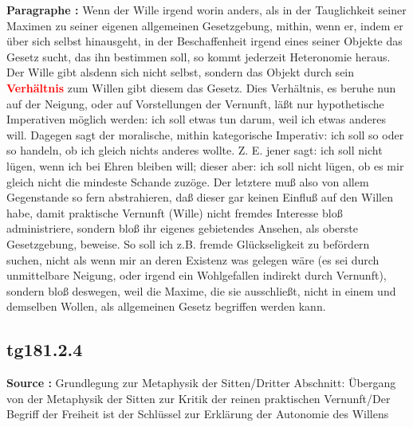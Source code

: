 \documentclass[a4paper,12pt,twoside]{book}
\newcommand{\match}[1]{\textcolor{red}{\textbf{#1}}}
\begin{document}
	\textbf{Paragraphe : }Wenn der Wille irgend worin anders, als in der Tauglichkeit seiner Maximen zu seiner eigenen allgemeinen Gesetzgebung, mithin, wenn er, indem er über sich selbst hinausgeht, in der Beschaffenheit irgend eines seiner Objekte das Gesetz sucht, das ihn bestimmen soll, so kommt jederzeit Heteronomie heraus. Der Wille gibt alsdenn sich nicht selbst, sondern das Objekt durch sein \match{Verhältnis} zum Willen gibt diesem das Gesetz. Dies Verhältnis, es beruhe nun auf der Neigung, oder auf Vorstellungen der Vernunft, läßt nur hypothetische Imperativen möglich werden: ich soll etwas tun darum, weil ich etwas anderes will. Dagegen sagt der moralische, mithin kategorische Imperativ: ich soll so oder so handeln, ob ich gleich nichts anderes wollte. Z. E. jener sagt: ich soll nicht lügen, wenn ich bei Ehren bleiben will; dieser aber: ich soll nicht lügen, ob es  mir gleich nicht die mindeste Schande zuzöge. Der letztere muß also von allem Gegenstande so fern abstrahieren, daß dieser gar keinen Einfluß auf den Willen habe, damit praktische Vernunft (Wille) nicht fremdes Interesse bloß administriere, sondern bloß ihr eigenes gebietendes Ansehen, als oberste Gesetzgebung, beweise. So soll ich z.B. fremde Glückseligkeit zu befördern suchen, nicht als wenn mir an deren Existenz was gelegen wäre (es sei durch unmittelbare Neigung, oder irgend ein Wohlgefallen indirekt durch Vernunft), sondern bloß deswegen, weil die Maxime, die sie ausschließt, nicht in einem und demselben Wollen, als allgemeinen Gesetz begriffen werden kann. 
	
	\subsection*{tg181.2.4} 
	\textbf{Source : }Grundlegung zur Metaphysik der Sitten/Dritter Abschnitt: Übergang von der Metaphysik der Sitten zur Kritik der reinen praktischen Vernunft/Der Begriff der Freiheit ist der Schlüssel zur Erklärung der Autonomie des Willens\\  
	
\end{document}
